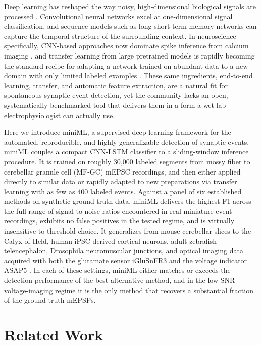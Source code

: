 Deep learning has reshaped the way noisy, high-dimensional biological signals are processed \citep{lecun2015deep}. Convolutional neural networks excel at one-dimensional signal classification, and sequence models such as long short-term memory networks can capture the temporal structure of the surrounding context. In neuroscience specifically, CNN-based approaches now dominate spike inference from calcium imaging \citep{rupprecht2021cascade}, and transfer learning from large pretrained models is rapidly becoming the standard recipe for adapting a network trained on abundant data to a new domain with only limited labeled examples \citep{theodoris2023transfer, yosinski2014transferable}. These same ingredients, end-to-end learning, transfer, and automatic feature extraction, are a natural fit for spontaneous synaptic event detection, yet the community lacks an open, systematically benchmarked tool that delivers them in a form a wet-lab electrophysiologist can actually use.

Here we introduce miniML, a supervised deep learning framework for the automated, reproducible, and highly generalizable detection of synaptic events. miniML couples a compact CNN-LSTM classifier to a sliding-window inference procedure. It is trained on roughly 30{,}000 labeled segments from mossy fiber to cerebellar granule cell (MF-GC) mEPSC recordings, and then either applied directly to similar data or rapidly adapted to new preparations via transfer learning with as few as 400 labeled events. Against a panel of six established methods on synthetic ground-truth data, miniML delivers the highest F1 across the full range of signal-to-noise ratios encountered in real miniature event recordings, exhibits no false positives in the tested regime, and is virtually insensitive to threshold choice. It generalizes from mouse cerebellar slices to the Calyx of Held, human iPSC-derived cortical neurons, adult zebrafish telencephalon, Drosophila neuromuscular junctions, and optical imaging data acquired with both the glutamate sensor iGluSnFR3 \citep{aggarwal2023iglusnfr3} and the voltage indicator ASAP5 \citep{hao2024asap5}. In each of these settings, miniML either matches or exceeds the detection performance of the best alternative method, and in the low-SNR voltage-imaging regime it is the only method that recovers a substantial fraction of the ground-truth mEPSPs.

\section{Related Work}

